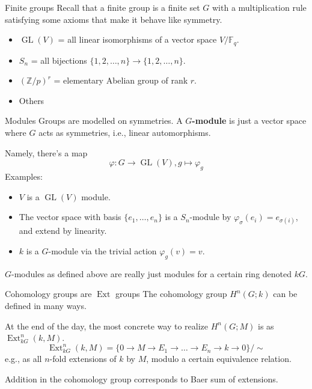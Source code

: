 \documentclass{beamer}
\theoremstyle{definition}
\newcommand{\GL}{\operatorname{GL}}
\newcommand{\FF}{\mathbb{F}}
\newcommand{\Ext}{\operatorname{Ext}}
\newcommand{\ZZ}{\mathbb{Z}}
\begin{document}
\begin{frame}{Finite groups}\pause
  Recall that a finite group is a finite set $G$ with a multiplication rule satisfying some axioms that make it behave like symmetry.\pause
  \begin{itemize}
  \item $\GL(V)$ = all linear isomorphisms of a vector space $V/\FF_q$.\pause
  \item $S_n$ = all bijections $\{1,2,\ldots,n\} \to \{1,2,\ldots,n\}$.\pause
  \item $(\ZZ/p)^r$ = elementary Abelian group of rank $r$.\pause
  \item Others
  \end{itemize}
  
\end{frame}

\begin{frame}{Modules}\pause
  Groups are modelled on symmetries. A \textbf{$G$-module} is just a vector space where $G$ acts as symmetries, i.e., linear automorphisms.\pause

  \vspace{0.2in}
  Namely, there's a map \[
    \varphi : G \to \GL(V), g \mapsto \varphi_g
  \]
\pause
  Examples:\pause
  \begin{itemize}
  \item $V$ is a $\GL(V)$ module.\pause
  \item The vector space with basis $\{e_1,\ldots,e_n\}$ is a $S_n$-module by $\varphi_\sigma(e_i) = e_{\sigma(i)}$, and extend by linearity.\pause
  \item $k$ is a $G$-module via the trivial action $\varphi_g(v) = v$.\pause
  \end{itemize}
  {\color{red} $G$-modules as defined above are really just modules for a certain ring denoted $kG$.}
\end{frame}

\begin{frame}{Cohomology groups are $\Ext$ groups}\pause
  The cohomology group $H^n(G;k)$ can be defined in many ways.\pause

  At the end of the day, the most concrete way to realize $H^n(G;M)$ is as $\Ext^n_{kG}(k,M)$.
  \[
\Ext_{kG}^n(k,M) = \big\{ 0 \to M \to E_1 \to \ldots \to E_n \to k \to 0 \big\} / \sim
  \]
  e.g., as all $n$-fold extensions of $k$ by $M$, modulo a certain equivalence relation.\pause

  Addition in the cohomology group corresponds to Baer sum of extensions.

\end{frame}
\end{document}
